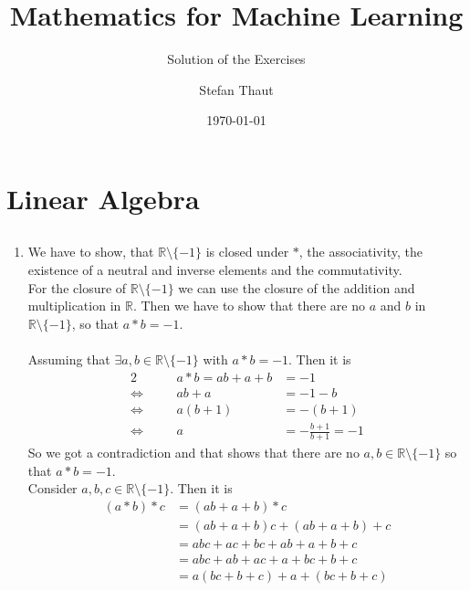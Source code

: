 \documentclass[solution]{tudexercise}
\title{Mathematics for Machine Learning}
\subtitle{Solution of the Exercises}
\author{Stefan Thaut}
\date{\today}
\begin{document}
	\maketitle
	
	\setcounter{section}{1}
	\section{Linear Algebra}
		\subsection{}
			\subsubsection{}
				\begin{enumerate}
				\item
				We have to show, that $\mathbb{R} \setminus \{-1\}$ is closed under $*$, the associativity, the existence of a neutral and inverse elements and the commutativity.\\
				For the closure of $\mathbb{R} \setminus \{-1\}$ we can use the closure of the addition and multiplication in $\mathbb{R}$. Then we have to show that there are no $a$ and $b$ in $\mathbb{R} \setminus \{-1\}$, so that $a * b = -1$.\\\\
				Assuming that $\exists a, b \in \mathbb{R} \setminus \{-1\}$ with $a * b = -1$. Then it is
				\begin{alignat*}{2}
&&a * b = ab + a + b &= -1\\
\Longleftrightarrow\quad &&ab + a &= -1 -b\\
\Longleftrightarrow\quad &&a(b + 1) &= -(b + 1)\\
\Longleftrightarrow\quad &&a &= -\frac{b + 1}{b + 1} = -1
				\end{alignat*}
				So we got a contradiction and that shows that there are no $a, b \in \mathbb{R} \setminus \{-1\}$ so that $a * b = -1$.\\
				Consider $a, b, c \in \mathbb{R} \setminus \{-1\}$. Then it is
				\begin{align*}
(a * b) * c &= (ab + a + b) * c\\
&= (ab + a + b)c + (ab + a + b) + c\\
&= abc + ac + bc + ab + a + b + c\\
&= abc + ab + ac + a + bc + b + c\\
&= a(bc + b + c) + a + (bc + b + c)\\

\end{align*}
\end{enumerate}
\end{document}

